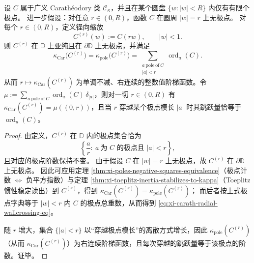 \begin{theorem}\label{thm:xi-carath-radial-wallcrossing}
设 \(C\) 属于广义 Carath\'eodory 类 \(\mathcal{C}_{\kappa}\)，并且在某个圆盘 \(\{w:|w|<R\}\) 内仅有有限个极点。
进一步假设：对任意 \(r\in(0,R)\)，函数 \(C\) 在圆周 \(|w|=r\) 上无极点。
对每个 \(r\in(0,R)\)，定义径向缩放
\[
C^{(r)}(w):=C(rw),\qquad |w|<1.
\]
则 \(C^{(r)}\) 在 \(\mathbb{D}\) 上亚纯且在 \(\partial\mathbb{D}\) 上无极点，并满足
\begin{equation}\label{eq:xi-carath-radial-wallcrossing-eq}
\boxed{\;
\kappa_{\mathrm{Car}}\!\bigl(C^{(r)}\bigr)
=\kappa_{\mathrm{pole}}\!\bigl(C^{(r)}\bigr)
=\sum_{\substack{a\ \mathrm{pole\ of}\ C\\ |a|<r}}\operatorname{ord}_{a}(C).\;}
\end{equation}
从而 \(r\mapsto \kappa_{\mathrm{Car}}(C^{(r)})\) 为单调不减、右连续的整数值阶梯函数。令 \(\mu:=\sum_{a\ \mathrm{pole\ of}\ C}\operatorname{ord}_{a}(C)\,\delta_{|a|}\)，则对一切 \(r\in(0,R)\) 有 \(\kappa_{\mathrm{Car}}(C^{(r)})=\mu((0,r))\)，且当 \(r\) 穿越某个极点模长 \(|a|\) 时其跳跃量恰等于 \(\operatorname{ord}_{a}(C)\)。
\end{theorem}
\begin{proof}
由定义，\(C^{(r)}\) 在 \(\mathbb{D}\) 内的极点集合恰为
\[
\left\{\frac{a}{r}:\ a\ \text{为 }C\text{ 的极点且 }|a|<r\right\},
\]
且对应的极点阶数保持不变。
由于假设 \(C\) 在 \(|w|=r\) 上无极点，故 \(C^{(r)}\) 在 \(\partial\mathbb{D}\) 上无极点。
因此可应用定理 \ref{thm:xi-poles-negative-squares-equivalence}（极点计数 \(\Longleftrightarrow\) 负平方指数）与定理 \ref{thm:xi-toeplitz-inertia-stabilizes-to-kappa}（Toeplitz 惯性稳定读出）到 \(C^{(r)}\)，得到
\(\kappa_{\mathrm{Car}}(C^{(r)})=\kappa_{\mathrm{pole}}(C^{(r)})\)；
而后者按上式极点字典等于 \(|w|<r\) 内 \(C\) 的极点总重数，从而得到 \eqref{eq:xi-carath-radial-wallcrossing-eq}。
\par
随 \(r\) 增大，集合 \(\{|a|<r\}\) 以“穿越极点模长”的离散方式增长，因此 \(\kappa_{\mathrm{pole}}(C^{(r)})\)（从而 \(\kappa_{\mathrm{Car}}(C^{(r)})\)）为右连续阶梯函数，且每次穿越的跳跃量等于该极点的阶数。证毕。
\end{proof}

